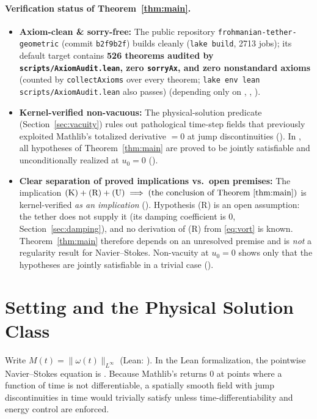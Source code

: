 \documentclass[11pt,a4paper]{article}
\theoremstyle{plain}
\theoremstyle{definition}
\theoremstyle{remark}
\begin{document}
\paragraph{Verification status of Theorem~\ref{thm:main}.}
\begin{itemize}
\item \textbf{Axiom-clean \& sorry-free:} The public repository \texttt{frohmanian-tether-geometric} (commit \texttt{b2f9b2f}) builds cleanly (\texttt{lake build}, 2713 jobs); its default target contains \textbf{526 theorems audited by \texttt{scripts/AxiomAudit.lean}, zero \texttt{sorryAx}, and zero nonstandard axioms} (counted by \texttt{collectAxioms} over every theorem; \texttt{lake env lean scripts/AxiomAudit.lean} also passes) (depending only on , , ).
\item \textbf{Kernel-verified non-vacuous:} The physical-solution predicate  (Section~\ref{sec:vacuity}) rules out pathological time-step fields that previously exploited Mathlib's totalized derivative  $=0$ at jump discontinuities (). In , all hypotheses of Theorem~\ref{thm:main} are proved to be jointly satisfiable and unconditionally realized at $u_0=0$ ().
\item \textbf{Clear separation of proved implications vs.\ open premises:} The implication $\text{(K)}+\text{(R)}+\text{(U)}\implies\text{(the conclusion of Theorem~\ref{thm:main})}$ is kernel-verified \emph{as an implication} (). Hypothesis (R) is an open assumption: the tether does not supply it (its damping coefficient is $0$, Section~\ref{sec:damping}), and no derivation of (R) from \eqref{eq:vort} is known. Theorem~\ref{thm:main} therefore depends on an unresolved premise and is \emph{not} a regularity result for Navier--Stokes. Non-vacuity at $u_0=0$ shows only that the hypotheses are jointly satisfiable in a trivial case ().
\end{itemize}

\section{Setting and the Physical Solution Class}\label{sec:setting}

Write $M(t)=\|\omega(t)\|_{L^\infty}$ (Lean: ). In the Lean formalization, the pointwise Navier--Stokes equation is . Because Mathlib's  returns $0$ at points where a function of time is not differentiable, a spatially smooth field with jump discontinuities in time would trivially satisfy  unless time-differentiability and energy control are enforced.
\end{document}
